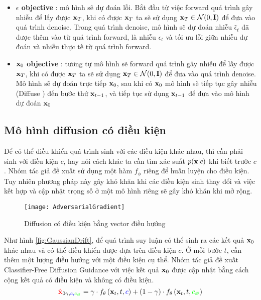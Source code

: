\begin{itemize}
	\item \textbf{$\epsilon$  objective} :  mô hình sẽ dự đoán lỗi. Bắt đầu từ việc forward quá trình gây nhiễu để lấy được $\mathbf{x}_T$, khi có được $\mathbf{x}_T$ ta sẽ sử dụng $\mathbf{x}_T \in \mathcal{N}(0, \mathbf{I})$ để đưa vào quá trình denoise. Trong quá trình denoise, mô hình sẽ dự đoán nhiễu $\hat{\epsilon}_t$ đã được thêm vào từ quá trình forward, là nhiễu $\epsilon_t$ và tối ưu lỗi giữa nhiễu dự đoán và nhiễu thực tế từ quá trình forward.
	\item \textbf{$\mathbf{x}_0$ objective} : tương tự mô hình sẽ forward quá trình gây nhiễu để lấy được $\mathbf{x}_T$, khi có được $\mathbf{x}_T$ ta sẽ sử dụng $\mathbf{x}_T \in \mathcal{N}(0, \mathbf{I})$ để đưa vào quá trình denoise. Mô hình sẽ dự đoán trực tiếp $\mathbf{x}_0$, sau khi có $\mathbf{x}_0$ mô hình sẽ tiếp tục gây nhiễu (Diffuse ) đến bước thứ $\mathbf{x}_{t-1}$, và tiếp tục sử dụng $\mathbf{x}_{t-1}$ để đưa vào mô hình dự đoán $\mathbf{x}_0$
\end{itemize}

\subsection{Mô hình diffusion có điều kiện}
\label{subsec:DiffusionCondition}

Để có thể điều khiển quá trình sinh với các điều kiện khác nhau, thì cần phải sinh với điều kiện $c$, hay nói cách khác ta cần tìm xác suất $p(\mathbf{x} | c)$ khi biết trước $c$. Nhóm tác giả \cite{dhariwal2021diffusion} đề xuất sử dụng một hàm $f_{\phi}$ riêng để huấn luyện cho điều kiện. Tuy nhiên phương pháp này gây khó khăn khi các điều kiện sinh thay đổi và việc kết hợp và cập nhật trọng số ở một mô hình riêng sẽ gây khó khăn khi mở rộng.

\begin{figure}[H]
	\captionsetup{skip=20pt}
	\texttt{[image: AdversarialGradient]}
	\caption{Diffusion có điều kiện bằng vector điều hướng}
	\label{fig:AdversarialGradient}
\end{figure}

Như hình \autoref{fig:GaussianDrift}, để quá trình suy luận có thể sinh ra các kết quả $\mathbf{x}_0$ khác nhau và có thể điều khiển được dựa trên điều kiện $c$. Ở mỗi bước $t$, cần thêm một lượng điều hướng với một điều kiện cụ thể. Nhóm tác giả đề xuất  Classifier-Free Diffusion Guidance \cite{ho2022classifier} với việc kết quả $\mathbf{x}_0$ được cập nhật bằng cách cộng kết quả có điều kiện và không có điều kiện.
\begin{equation}
{\color{red}{\hat{\mathbf{x}}}}_{0 \gamma, \color{blue}{c}, \color{green}{c_{\varnothing}}}=\gamma \cdot f_{\theta} \left(\mathbf{x}_{t}, t, {\color{blue}{c}} \right)+(1-\gamma) \cdot f_{\theta} \left(\mathbf{x}_{t}, t, {\color{green}{c_{\varnothing}}} \right)
\end{equation}

